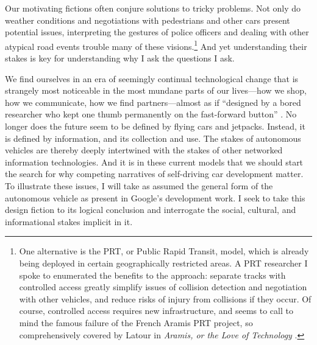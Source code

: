 
Our motivating fictions often conjure solutions to tricky problems.
Not only do weather conditions and negotiations with pedestrians and
other cars present potential issues, interpreting the gestures of
police officers and dealing with other atypical road events trouble
many of these visions.\footnote{One alternative is the PRT, or Public Rapid
Transit, model, which is already being deployed in certain
geographically restricted areas. A PRT researcher I spoke to
enumerated the benefits to the approach: separate tracks with
controlled access greatly simplify issues of collision detection and
negotiation with other vehicles, and reduce risks of injury from collisions if
they occur. Of course, controlled access requires new infrastructure,
and seems to call to mind the famous failure of the French Aramis PRT
project, so comprehensively covered by Latour in \emph{Aramis, or the
  Love of Technology} \cite{Aramis}.} And yet understanding their
stakes is key for understanding why I ask the questions I ask.

We find ourselves in an era of seemingly continual technological
change that is strangely most noticeable in the most mundane parts of
our lives---how we shop, how we communicate, how we find
partners---almost as if ``designed by a bored researcher who kept one
thumb permanently on the fast-forward button'' \cite[p.
  7]{Neuromancer1984}. No longer does the future seem to be
defined by flying cars and jetpacks. Instead, it is defined by
information, and its collection and use. The stakes of autonomous
vehicles are thereby deeply intertwined with the
stakes of other networked information technologies. And it is in these
current models that we should start the search for why competing
narratives of self-driving car development matter. To illustrate these
issues, I will
take as assumed the general form of the autonomous vehicle as present
in Google's development work. I seek to take this design fiction
to its logical conclusion and interrogate the social,
cultural, and informational stakes implicit in it.


